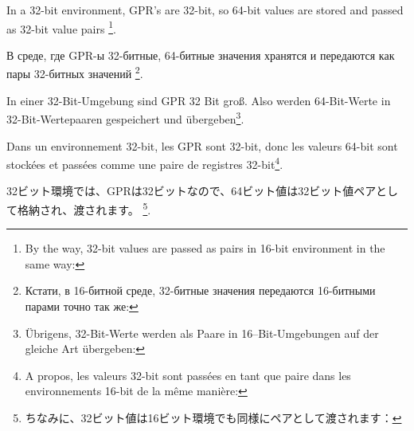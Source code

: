 \ifdefined\ENGLISH
{}
\label{sec:64bit_in_32_env}

In a 32-bit environment, \ac{GPR}'s are 32-bit, so 64-bit values are stored and passed as 32-bit value pairs
\footnote{By the way, 32-bit values are passed as pairs in 16-bit environment in the same way: }.
\fi

\ifdefined\RUSSIAN
{}
\label{sec:64bit_in_32_env}

В среде, где \ac{GPR}-ы 32-битные, 64-битные значения хранятся и передаются как пары 32-битных значений
\footnote{Кстати, в 16-битной среде, 32-битные значения передаются 16-битными парами точно так же: }.
\fi

\ifdefined\GERMAN
{}
\label{sec:64bit_in_32_env}

In einer 32-Bit-Umgebung sind \ac{GPR} 32 Bit groß. Also werden 64-Bit-Werte in
32-Bit-Wertepaaren gespeichert und übergeben\footnote{Übrigens, 32-Bit-Werte werden
als Paare in 16--Bit-Umgebungen auf der gleiche Art übergeben: }.
\fi

\ifdefined\FRENCH
{}
\label{sec:64bit_in_32_env}

Dans un environnement 32-bit, les \ac{GPR} sont 32-bit, donc les valeurs 64-bit sont
stockées et passées comme une paire de registres 32-bit\footnote{A propos, les valeurs
32-bit sont passées en tant que paire dans les environnements 16-bit de la même manière:
}.
\fi

\ifdefined\JAPANESE
{}
\label{sec:64bit_in_32_env}

32ビット環境では、\ac{GPR}は32ビットなので、64ビット値は32ビット値ペアとして格納され、渡されます。
\footnote{ちなみに、32ビット値は16ビット環境でも同様にペアとして渡されます： }.
\fi







